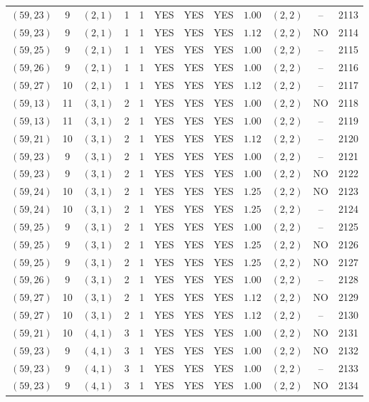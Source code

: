 \begin{longtable}{|c|c|c|c|c|c|c|c|c|c|c|c|}
$(59,23)$ & 9 & $(2,1)$ & 1 & 1 & YES & YES & YES & $1.00$ & $(2,2)$ & -- & 2113\\
$(59,23)$ & 9 & $(2,1)$ & 1 & 1 & YES & YES & YES & $1.12$ & $(2,2)$ & NO & 2114\\
$(59,25)$ & 9 & $(2,1)$ & 1 & 1 & YES & YES & YES & $1.00$ & $(2,2)$ & -- & 2115\\
$(59,26)$ & 9 & $(2,1)$ & 1 & 1 & YES & YES & YES & $1.00$ & $(2,2)$ & -- & 2116\\
$(59,27)$ & 10 & $(2,1)$ & 1 & 1 & YES & YES & YES & $1.12$ & $(2,2)$ & -- & 2117\\
$(59,13)$ & 11 & $(3,1)$ & 2 & 1 & YES & YES & YES & $1.00$ & $(2,2)$ & NO & 2118\\
$(59,13)$ & 11 & $(3,1)$ & 2 & 1 & YES & YES & YES & $1.00$ & $(2,2)$ & -- & 2119\\
$(59,21)$ & 10 & $(3,1)$ & 2 & 1 & YES & YES & YES & $1.12$ & $(2,2)$ & -- & 2120\\
$(59,23)$ & 9 & $(3,1)$ & 2 & 1 & YES & YES & YES & $1.00$ & $(2,2)$ & -- & 2121\\
$(59,23)$ & 9 & $(3,1)$ & 2 & 1 & YES & YES & YES & $1.00$ & $(2,2)$ & NO & 2122\\
$(59,24)$ & 10 & $(3,1)$ & 2 & 1 & YES & YES & YES & $1.25$ & $(2,2)$ & NO & 2123\\
$(59,24)$ & 10 & $(3,1)$ & 2 & 1 & YES & YES & YES & $1.25$ & $(2,2)$ & -- & 2124\\
$(59,25)$ & 9 & $(3,1)$ & 2 & 1 & YES & YES & YES & $1.00$ & $(2,2)$ & -- & 2125\\
$(59,25)$ & 9 & $(3,1)$ & 2 & 1 & YES & YES & YES & $1.25$ & $(2,2)$ & NO & 2126\\
$(59,25)$ & 9 & $(3,1)$ & 2 & 1 & YES & YES & YES & $1.25$ & $(2,2)$ & NO & 2127\\
$(59,26)$ & 9 & $(3,1)$ & 2 & 1 & YES & YES & YES & $1.00$ & $(2,2)$ & -- & 2128\\
$(59,27)$ & 10 & $(3,1)$ & 2 & 1 & YES & YES & YES & $1.12$ & $(2,2)$ & NO & 2129\\
$(59,27)$ & 10 & $(3,1)$ & 2 & 1 & YES & YES & YES & $1.12$ & $(2,2)$ & -- & 2130\\
$(59,21)$ & 10 & $(4,1)$ & 3 & 1 & YES & YES & YES & $1.00$ & $(2,2)$ & NO & 2131\\
$(59,23)$ & 9 & $(4,1)$ & 3 & 1 & YES & YES & YES & $1.00$ & $(2,2)$ & NO & 2132\\
$(59,23)$ & 9 & $(4,1)$ & 3 & 1 & YES & YES & YES & $1.00$ & $(2,2)$ & -- & 2133\\
$(59,23)$ & 9 & $(4,1)$ & 3 & 1 & YES & YES & YES & $1.00$ & $(2,2)$ & NO & 2134\\

\end{longtable}
